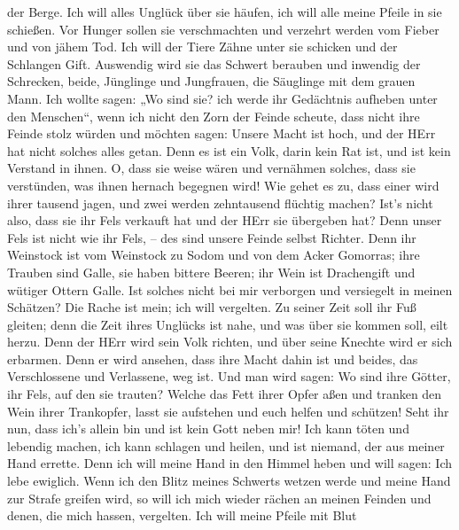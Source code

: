 der Berge.  Ich will alles Unglück über sie häufen, ich
will alle meine Pfeile in sie schießen.  Vor Hunger sollen
sie verschmachten und verzehrt werden vom Fieber und von jähem Tod. Ich
will der Tiere Zähne unter sie schicken und der Schlangen Gift.
 Auswendig wird sie das Schwert berauben und inwendig der
Schrecken, beide, Jünglinge und Jungfrauen, die Säuglinge mit dem grauen
Mann.  Ich wollte sagen: „Wo sind sie? ich werde ihr
Gedächtnis aufheben unter den Menschen``,  wenn ich nicht
den Zorn der Feinde scheute, dass nicht ihre Feinde stolz würden und
möchten sagen: Unsere Macht ist hoch, und der HErr hat nicht solches
alles getan.  Denn es ist ein Volk, darin kein Rat ist, und
ist kein Verstand in ihnen.  O, dass sie weise wären und
vernähmen solches, dass sie verstünden, was ihnen hernach begegnen wird!
 Wie gehet es zu, dass einer wird ihrer tausend jagen, und
zwei werden zehntausend flüchtig machen? Ist's nicht also, dass sie ihr
Fels verkauft hat und der HErr sie übergeben hat?  Denn
unser Fels ist nicht wie ihr Fels, -- des sind unsere Feinde selbst
Richter.  Denn ihr Weinstock ist vom Weinstock zu Sodom und
von dem Acker Gomorras; ihre Trauben sind Galle, sie haben bittere
Beeren;  ihr Wein ist Drachengift und wütiger Ottern Galle.
 Ist solches nicht bei mir verborgen und versiegelt in
meinen Schätzen?  Die Rache ist mein; ich will vergelten.
Zu seiner Zeit soll ihr Fuß gleiten; denn die Zeit ihres Unglücks ist
nahe, und was über sie kommen soll, eilt herzu.  Denn der
HErr wird sein Volk richten, und über seine Knechte wird er sich
erbarmen. Denn er wird ansehen, dass ihre Macht dahin ist und beides,
das Verschlossene und Verlassene, weg ist.  Und man wird
sagen: Wo sind ihre Götter, ihr Fels, auf den sie trauten? 
Welche das Fett ihrer Opfer aßen und tranken den Wein ihrer Trankopfer,
lasst sie aufstehen und euch helfen und schützen!  Seht ihr
nun, dass ich's allein bin und ist kein Gott neben mir! Ich kann töten
und lebendig machen, ich kann schlagen und heilen, und ist niemand, der
aus meiner Hand errette.  Denn ich will meine Hand in den
Himmel heben und will sagen: Ich lebe ewiglich.  Wenn ich
den Blitz meines Schwerts wetzen werde und meine Hand zur Strafe greifen
wird, so will ich mich wieder rächen an meinen Feinden und denen, die
mich hassen, vergelten.  Ich will meine Pfeile mit Blut
